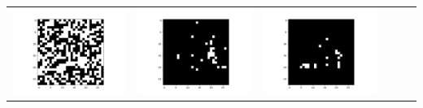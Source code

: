 \documentclass[12pt]{report}
\begin{document}
\begin{table}[H]
\begin{tabular}{  c  c  c  c  c  c }
\begin{minipage}{.15\textwidth}
      \includegraphics[scale=0.2]{BM_d1.png}
    \end{minipage} &
    \begin{minipage}{.15\textwidth}
      \includegraphics[scale=0.2]{BM_d2.png}
    \end{minipage} &
    \begin{minipage}{.15\textwidth}
      \includegraphics[scale=0.2]{BM_d4.png}

\end{minipage}
\end{tabular}
\end{table}
\end{document}
